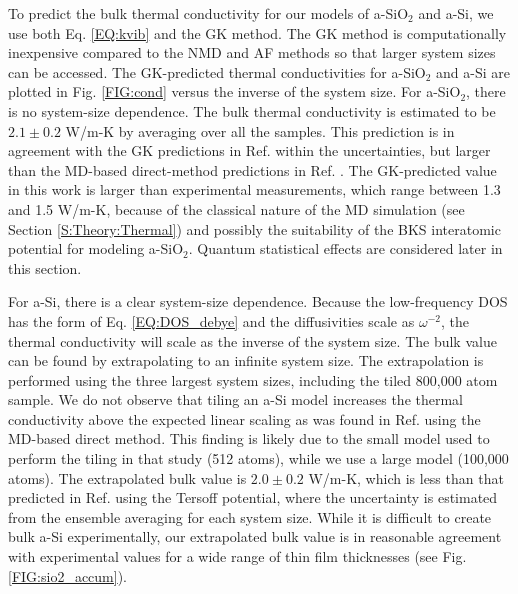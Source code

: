 \documentclass[aps,prb,onecolumn,preprint,superscriptaddress,footinbib,amsmath,amssymb,floatfix]{revtex4}
\begin{document}
To predict the bulk thermal conductivity for our models of a-SiO$_2$ and 
a-Si, we use both Eq. \eqref{EQ:kvib} 
and the GK method. The GK method is computationally 
inexpensive compared to the NMD and AF methods so that 
larger system sizes can be accessed.  
The GK-predicted thermal conductivities for a-SiO$_2$ and a-Si 
are plotted in Fig. \ref{FIG:cond} versus the inverse of the system 
size. For a-SiO$_2$, there is no system-size dependence.  
The bulk thermal conductivity is estimated to be 
$2.1 \pm 0.2$ W/m-K by averaging over all the samples. This prediction 
is in agreement with the GK predictions in Ref. 
 within the uncertainties, 
but larger than the MD-based direct-method predictions in Ref. 
. 
The GK-predicted value in this work is larger than experimental 
measurements, which range between 
1.3 and 1.5 W/m-K,
\cite{cahill_lattice_1988,lee_heat_1997,
yamane_measurement_2002,regner_broadband_2013} 
because of the classical 
nature of the MD simulation (see Section \ref{S:Theory:Thermal}) 
and possibly the suitability of the BKS interatomic potential 
for modeling a-SiO$_2$.
\cite{jund_molecular-dynamics_1999,mcgaughey_thermal_2004}
Quantum statistical effects are considered later in this section. 

For a-Si, there is a clear system-size dependence. 
Because the low-frequency DOS has the form of Eq. \eqref{EQ:DOS_debye} 
and the diffusivities scale as $\omega^{-2}$,  
the thermal conductivity will scale as the inverse of the system size. 
The bulk value can be found by extrapolating to an infinite system size.
\cite{shiomi_thermal_2011,esfarjani_heat_2011,larkin_comparison_2012} 
The extrapolation is performed using the three largest 
system sizes, including the tiled 800,000 atom sample.  
We do not observe that tiling an a-Si model increases 
the thermal conductivity above the expected linear scaling as 
was found in Ref.  using the MD-based 
direct method. This finding is likely due to the 
small model used to perform the tiling in that study (512 atoms),  
while we use a large model (100,000 atoms). 
The extrapolated bulk value is $2.0 \pm 0.2$ W/m-K, which 
is less than that predicted in Ref.  
using the Tersoff potential, where the uncertainty is 
estimated from the ensemble averaging for each system size. 
While it is difficult to create 
bulk a-Si experimentally,\cite{vacher_attenuation_1980} 
our extrapolated bulk value 
is in reasonable agreement with experimental values for a wide 
range of thin film thicknesses (see Fig. \ref{FIG:sio2_accum}). 
\end{document}
